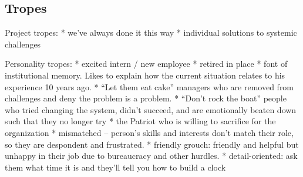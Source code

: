 \subsection{Tropes\label{sec:tropes}}

Project tropes:
* we've always done it this way
* individual solutions to systemic challenges


Personality tropes:
* excited intern / new employee
* retired in place
* font of institutional memory. Likes to explain how the current situation relates to his experience 10 years ago. 
* ``Let them eat cake'' managers who are removed from challenges and deny the problem is a problem. 
* ``Don't rock the boat'' people who tried changing the system, didn't succeed, and are emotionally beaten down such that they no longer try
* the Patriot who is willing to sacrifice for the organization
* mismatched -- person's skills and interests don't match their role, so they are despondent and frustrated. 
* friendly grouch: friendly and helpful but unhappy in their job due to bureaucracy and other hurdles.
* detail-oriented: ask them what time it is and they'll tell you how to build a clock



